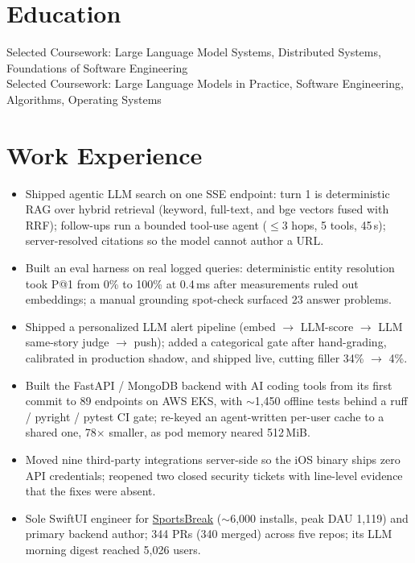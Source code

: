 \documentclass[11pt, letterpaper]{article}
\begin{document}

\section{Education}
Selected Coursework: Large Language Model Systems, Distributed Systems, Foundations of Software Engineering\\[1pt]
Selected Coursework: Large Language Models in Practice, Software Engineering, Algorithms, Operating Systems

\section{Work Experience}
\begin{itemize}
  \item Shipped agentic LLM search on one SSE endpoint: turn 1 is deterministic RAG over hybrid retrieval (keyword, full-text, and bge vectors fused with RRF); follow-ups run a bounded tool-use agent ($\le$3 hops, 5 tools, 45\,s); server-resolved citations so the model cannot author a URL.
  \item Built an eval harness on real logged queries: deterministic entity resolution took P@1 from 0\% to 100\% at 0.4\,ms after measurements ruled out embeddings; a manual grounding spot-check surfaced 23 answer problems.
  \item Shipped a personalized LLM alert pipeline (embed $\to$ LLM-score $\to$ LLM same-story judge $\to$ push); added a categorical gate after hand-grading, calibrated in production shadow, and shipped live, cutting filler 34\% $\to$ 4\%.
  \item Built the FastAPI / MongoDB backend with AI coding tools from its first commit to 89 endpoints on AWS EKS, with $\sim$1{,}450 offline tests behind a ruff / pyright / pytest CI gate; re-keyed an agent-written per-user cache to a shared one, 78$\times$ smaller, as pod memory neared 512\,MiB.
  \item Moved nine third-party integrations server-side so the iOS binary ships zero API credentials; reopened two closed security tickets with line-level evidence that the fixes were absent.
  \item Sole SwiftUI engineer for \href{https://apps.apple.com/app/id6762649287}{SportsBreak} ($\sim$6{,}000 installs, peak DAU 1{,}119) and primary backend author; 344 PRs (340 merged) across five repos; its LLM morning digest reached 5{,}026 users.
\end{itemize}
\end{document}
